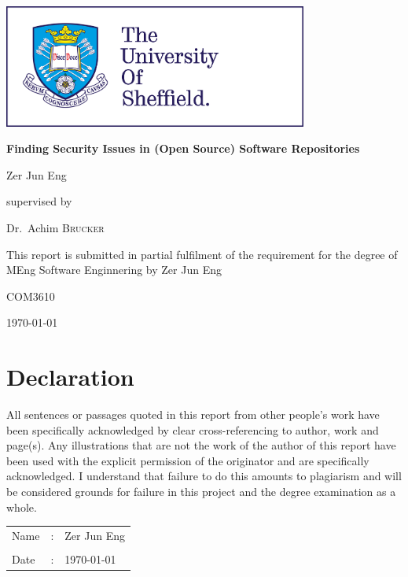 \documentclass[12pt, a4paper]{report}
\begin{document}
\begin{titlepage}
  \centering
  \includegraphics[width=10cm]{images/tuos_logo}\par\vspace{1cm}
  \vspace{1cm}

  {\huge\bfseries Finding Security Issues in (Open Source) Software Repositories\par}
  \vspace{1cm}

  {\Large Zer Jun Eng\par}
  \vspace{1cm}

  supervised by\par Dr.~Achim \textsc{Brucker}
  \vfill

  {This report is submitted in partial fulfilment of the requirement for the degree of MEng Software
    Enginnering by Zer Jun Eng}
  \vfill

  {\large COM3610}
  \vfill

  {\large \today}
\end{titlepage}


\chapter*{Declaration}
All sentences or passages quoted in this report from other people's work have been specifically
acknowledged by clear cross-referencing to author, work and page(s). Any illustrations that are not
the work of the author of this report have been used with the explicit permission of the originator
and are specifically acknowledged. I understand that failure to do this amounts to plagiarism and
will be considered grounds for failure in this project and the degree examination as a whole.
\vspace{2cm}

\noindent \begin{tabular}{llp{4.5cm}}
  Name & : & Zer Jun Eng \\ \cline{3-3}
  \\ [-0.5em]
  Date & : & \today      \\ \cline{3-3}
\end{tabular}
\end{document}
